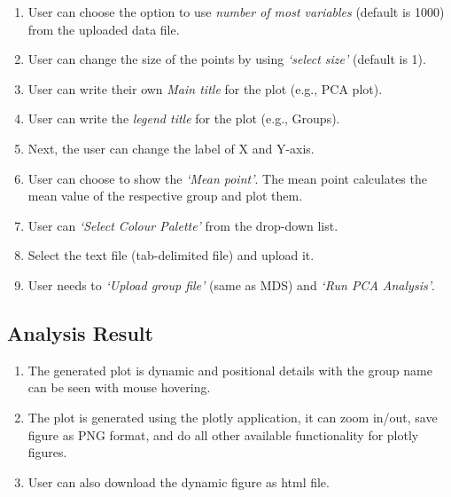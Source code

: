 \documentclass[
  a4paper,
  DIV=11,
  numbers=noendperiod,
  oneside,
  open=any]{scrreport}
\providecommand{\tightlist}{%
  \setlength{\itemsep}{0pt}\setlength{\parskip}{0pt}}\usepackage{longtable,booktabs,array}
\begin{document}
\begin{enumerate}
\def\labelenumi{\arabic{enumi}.}
\tightlist
\item
  User can choose the option to use \emph{number of most variables}
  (default is 1000) from the uploaded data file.
\item
  User can change the size of the points by using \emph{`select size'}
  (default is 1).
\item
  User can write their own \emph{Main title} for the plot (e.g., PCA
  plot).
\item
  User can write the \emph{legend title} for the plot (e.g., Groups).
\item
  Next, the user can change the label of X and Y-axis.
\item
  User can choose to show the \emph{`Mean point'}. The mean point
  calculates the mean value of the respective group and plot them.
\item
  User can \emph{`Select Colour Palette'} from the drop-down list.
\item
  Select the text file (tab-delimited file) and upload it.
\item
  User needs to \emph{`Upload group file'} (same as MDS) and \emph{`Run
  PCA Analysis'}.
\end{enumerate}

\subsection{Analysis Result}\label{analysis-result-1}

\begin{enumerate}
\def\labelenumi{\arabic{enumi}.}
\tightlist
\item
  The generated plot is dynamic and positional details with the group
  name can be seen with mouse hovering.
\item
  The plot is generated using the plotly application, it can zoom
  in/out, save figure as PNG format, and do all other available
  functionality for plotly figures.
\item
  User can also download the dynamic figure as html file.
\end{enumerate}
\end{document}
